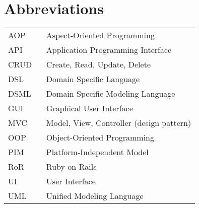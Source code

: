 \chapter*{Abbreviations}

\begin{flushleft}
\begin{tabular}{l p{0.8\linewidth}}
AOP       & Aspect-Oriented Programming\\
API       & Application Programming Interface\\
CRUD      & Create, Read, Update, Delete\\
DSL       & Domain Specific Language\\
DSML      & Domain Specific Modeling Language\\
GUI       & Graphical User Interface\\
MVC       & Model, View, Controller (design pattern)\\
OOP       & Object-Oriented Programming\\
PIM       & Platform-Independent Model\\
RoR       & Ruby on Rails\\
UI        & User Interface\\
UML       & Unified Modeling Language\\
\end{tabular}
\end{flushleft}

